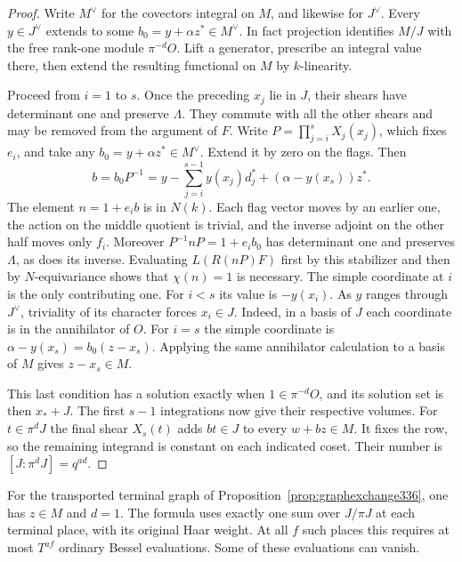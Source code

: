 \documentclass[a4paper,11pt]{article}
\theoremstyle{definition}
\theoremstyle{remark}
\numberwithin{equation}{section}
\begin{document}
\begin{proof}
Write \(M^\vee\) for the covectors integral on \(M\), and likewise
for \(J^\vee\). Every \(y\in J^\vee\) extends to some
\(b_0=y+\alpha z^*\in M^\vee\). In fact projection identifies
\(M/J\) with the free rank-one module \(\pi^{-d}O\). Lift a generator,
prescribe an integral value there, then extend the resulting
functional on \(M\) by \(k\)-linearity.

Proceed from \(i=1\) to \(s\). Once the preceding \(x_j\) lie in
\(J\), their shears have determinant one and preserve \(\Lambda\).
They commute with all the other shears and may be removed from the
argument of \(F\). Write \(P=\prod_{j=i}^s X_j(x_j)\), which fixes
\(e_i\), and take any \(b_0=y+\alpha z^*\in M^\vee\). Extend it
by zero on the flags. Then
\[
 b=b_0P^{-1}
   =y-\sum_{j=i}^{s-1}y(x_j)d_j^*+
                                  (\alpha-y(x_s))z^* .
\]
The element \(n=1+e_i b\) is in \(N(k)\). Each flag vector moves
by an earlier one, the action on the middle quotient is trivial,
and the inverse adjoint on the other half moves only \(f_i\).
Moreover \(P^{-1}nP=1+e_i b_0\) has determinant one and preserves
\(\Lambda\), as does its inverse. Evaluating \(L(R(nP)F)\) first
by this stabilizer and then by \(N\)-equivariance shows that
\(\chi(n)=1\) is necessary. The simple coordinate at \(i\) is
the only contributing one. For \(i<s\) its value is \(-y(x_i)\).
As \(y\) ranges through \(J^\vee\), triviality of its character
forces \(x_i\in J\). Indeed, in a basis of \(J\) each coordinate
is in the annihilator of \(O\). For \(i=s\) the simple coordinate
is \(\alpha-y(x_s)=b_0(z-x_s)\). Applying the same annihilator
calculation to a basis of \(M\) gives \(z-x_s\in M\).

This last condition has a solution exactly when \(1\in\pi^{-d}O\),
and its solution set is then \(x_*+J\). The first \(s-1\) integrations
now give their respective volumes. For \(t\in\pi^dJ\) the final
shear \(X_s(t)\) adds \(bt\in J\) to every \(w+bz\in M\).
It fixes the row, so the remaining integrand is constant on each
indicated coset. Their number is \([J:\pi^dJ]=q^{ad}\).
\end{proof}

For the transported terminal graph of Proposition~\ref{prop:graphexchange336},
one has \(z\in M\) and \(d=1\). The formula uses exactly one sum
over \(J/\pi J\) at each terminal place, with its original Haar
weight. At all \(f\) such places this requires at most \(T^{af}\)
ordinary Bessel evaluations. Some of these evaluations can vanish.
\end{document}
